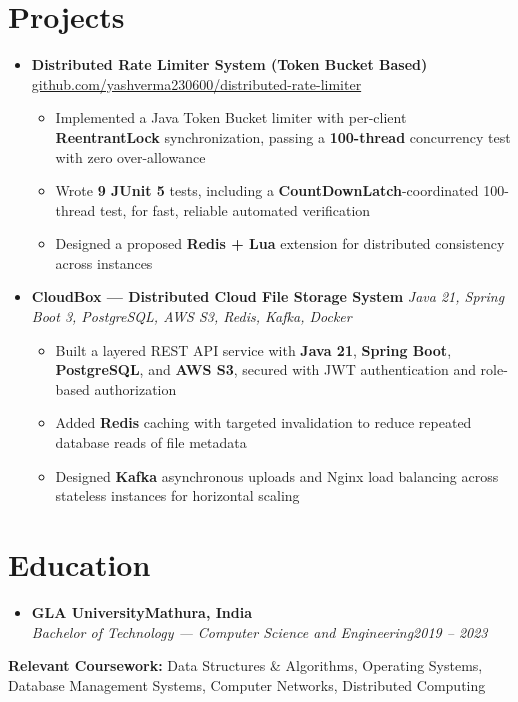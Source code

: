 \documentclass[letterpaper,11pt]{article}
\newcommand{\resumeItem}[1]{
  \item\small{{#1 \vspace{-2pt}}}
}
\newcommand{\resumeSubheading}[4]{
  \vspace{-2pt}\item
    \textbf{#1}\hfill \textbf{\small #2} \\
    \textit{\small #3}\hfill \textit{\small #4}\vspace{-7pt}
}
\newcommand{\resumeProjectHeading}[2]{
    \item
    \small #1\hfill \textbf{\small #2}\vspace{-7pt}
}
\newcommand{\resumeSubHeadingListStart}{\begin{itemize}[leftmargin=0.0in, label={}]}
\newcommand{\resumeSubHeadingListEnd}{\end{itemize}}
\newcommand{\resumeItemListStart}{\begin{itemize}}
\newcommand{\resumeItemListEnd}{\end{itemize}\vspace{-5pt}}
\begin{document}
\section{Projects}
  \resumeSubHeadingListStart
    \resumeProjectHeading
      {\textbf{Distributed Rate Limiter System (Token Bucket Based)} \textbar{} \href{https://github.com/yashverma230600/distributed-rate-limiter}{github.com/yashverma230600/distributed-rate-limiter}}{}
      \resumeItemListStart
        \resumeItem{Implemented a Java Token Bucket limiter with per-client \textbf{ReentrantLock} synchronization, passing a \textbf{100-thread} concurrency test with zero over-allowance}
        \resumeItem{Wrote \textbf{9 JUnit 5} tests, including a \textbf{CountDownLatch}-coordinated 100-thread test, for fast, reliable automated verification}
        \resumeItem{Designed a proposed \textbf{Redis + Lua} extension for distributed consistency across instances}
      \resumeItemListEnd
    \resumeProjectHeading
      {\textbf{CloudBox --- Distributed Cloud File Storage System} \textbar{} \textit{\small Java 21, Spring Boot 3, PostgreSQL, AWS S3, Redis, Kafka, Docker}}{}
      \resumeItemListStart
        \resumeItem{Built a layered REST API service with \textbf{Java 21}, \textbf{Spring Boot}, \textbf{PostgreSQL}, and \textbf{AWS S3}, secured with JWT authentication and role-based authorization}
        \resumeItem{Added \textbf{Redis} caching with targeted invalidation to reduce repeated database reads of file metadata}
        \resumeItem{Designed \textbf{Kafka} asynchronous uploads and Nginx load balancing across stateless instances for horizontal scaling}
      \resumeItemListEnd
  \resumeSubHeadingListEnd
\vspace{-8pt}

\section{Education}
  \resumeSubHeadingListStart
    \resumeSubheading
      {GLA University}{Mathura, India}
      {Bachelor of Technology --- Computer Science and Engineering}{2019 -- 2023}
  \resumeSubHeadingListEnd
  \vspace{-2pt}
  \begin{itemize}[leftmargin=0.15in, label={}]
    \small{\item{
      \textbf{Relevant Coursework:} Data Structures \& Algorithms, Operating Systems, Database Management Systems, Computer Networks, Distributed Computing
    }}
  \end{itemize}
\vspace{-4pt}
\end{document}
